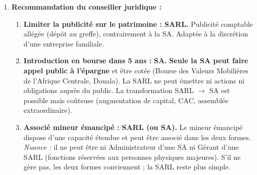 \documentclass[11pt]{article}
\begin{document}
\begin{corrige}
\begin{enumerate}
    \item \textbf{Recommandation du conseiller juridique :}
    \begin{enumerate}
        \item[(a)] \textbf{Limiter la publicité sur le patrimoine :} \textbf{SARL.} Publicité comptable allégée (dépôt au greffe), contrairement à la SA. Adaptée à la discrétion d'une entreprise familiale.
        \item[(b)] \textbf{Introduction en bourse dans 5 ans :} \textbf{SA.} \textbf{Seule la SA peut faire appel public à l'épargne} et être cotée (Bourse des Valeurs Mobilières de l'Afrique Centrale, Douala). La SARL ne peut émettre ni actions ni obligations auprès du public. La transformation SARL $\rightarrow$ SA est possible mais coûteuse (augmentation de capital, CAC, assemblée extraordinaire).
        \item[(c)] \textbf{Associé mineur émancipé :} \textbf{SARL (ou SA).} Le mineur émancipé dispose d'une capacité étendue et peut être associé dans les deux formes. \emph{Nuance :} il ne peut être ni Administrateur d'une SA ni Gérant d'une SARL (fonctions réservées aux personnes physiques majeures). S'il ne gère pas, les deux formes conviennent ; la SARL reste plus simple.
    \end{enumerate}
\end{enumerate}
\end{corrige}
\end{document}
